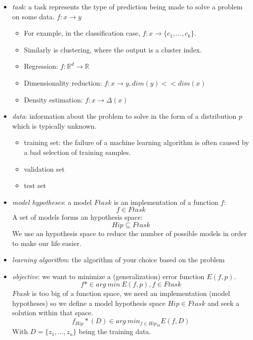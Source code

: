 \documentclass[11pt]{article}
\begin{document}
\begin{itemize}
\tightlist
\item
  \emph{task}: a task represents the type of prediction being made to
  solve a problem on some data. \(f: x \rightarrow y\)

  \begin{itemize}
  \tightlist
  \item
    For example, in the classification case,
    \(f: x \rightarrow \{c_1, ..., c_k \}\).
  \item
    Similarly is clustering, where the output is a cluster index.
  \item
    Regression: \(f: \mathbb{R}^d \rightarrow \mathbb{R}\)
  \item
    Dimensionality reduction: \(f: x \rightarrow y, dim(y) << dim(x)\)
  \item
    Density estimation: \(f: x \rightarrow \Delta (x)\)
  \end{itemize}
\item
  \emph{data}: information about the problem to solve in the form of a
  distribution \(p\) which is typically unknown.

  \begin{itemize}
  \tightlist
  \item
    training set: the failure of a machine learning algorithm is often
    caused by a bad selection of training samples.
  \item
    validation set
  \item
    test set
  \end{itemize}
\item
  \emph{model hypotheses}: a model \(Ftask\) is an implementation of a
  function \(f\): \[f \in Ftask\] A set of models forms an hypothesis
  space: \[Hip \subseteq Ftask\] We use an hypothesis space to reduce
  the number of possible models in order to make our life easier.
\item
  \emph{learning algorithm}: the algorithm of your choice based on the
  problem
\item
  \emph{objective}: we want to minimize a (generalization) error
  function \(E(f, p)\). \[f* \in arg\ min\ E(f,p), f \in Ftask\]
  \(Ftask\) is too big of a function space, we need an implementation
  (model hypotheses) so we define a model hypothesis space
  \(Hip \in Ftask\) and seek a solution within that space.
  \[f_{Hip}*(D) \in arg\ min_{f \in Hip_M} E(f, D)\] With
  \(D=\{z_1, ..., z_n\}\) being the training data.
\end{itemize}
\end{document}
